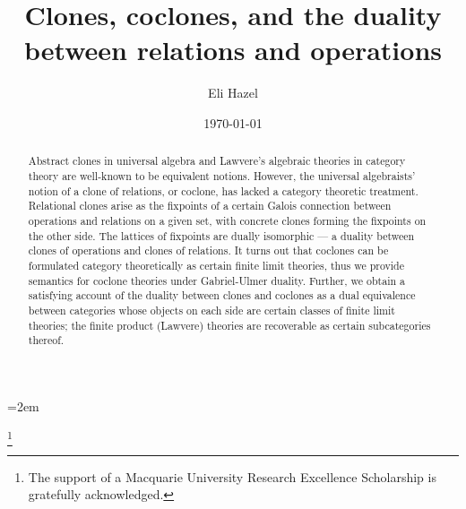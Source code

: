 \documentclass[11pt, a4paper, twoside,leqno]{amsart}
\numberwithin{equation}{section}
\theoremstyle{plain}
\theoremstyle{definition}
\begin{document}
\leftmargini=2em 
\title{Clones, coclones, and the duality between relations and operations}
\author{Eli Hazel} 
\address{School of Mathematical and Physical Sciences, Macquarie University, NSW 2109, Australia} 

\date{\today}

\thanks{The support of a Macquarie University Research Excellence
  Scholarship is gratefully acknowledged.}

\begin{abstract}
  Abstract clones in universal algebra and Lawvere's algebraic
  theories in category theory are well-known to be equivalent notions.
  However, the universal algebraists' notion of a clone of relations, or coclone, has lacked a category
  theoretic treatment. Relational clones arise as the fixpoints of a certain
  Galois connection between operations and relations on a given set,
  with concrete clones forming the fixpoints on the other side. The lattices of
  fixpoints are dually isomorphic --- a duality between
  clones of operations and clones of relations.
It turns out that coclones can be formulated category theoretically as
certain finite limit theories, thus we provide semantics for coclone theories under
Gabriel-Ulmer duality. Further, we obtain a satisfying account
of the duality between clones and coclones as a dual equivalence
  between categories whose objects on each side are certain classes of
  finite limit theories; the finite product (Lawvere) theories are
  recoverable as certain subcategories thereof.
\end{abstract}
\maketitle
\end{document}
